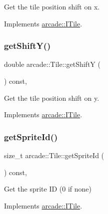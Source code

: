 Get the tile position shift on x. 



Implements \hyperlink{classarcade_1_1_i_tile_aaa83bd96759c2c9f369be4b00b8a72d2}{arcade\+::\+I\+Tile}.

\mbox{\label{classarcade_1_1_tile_aa28fe418563d90bd65e1c58510d28eef}} 
\subsubsection{\texorpdfstring{get\+Shift\+Y()}{getShiftY()}}
{\footnotesize\ttfamily double arcade\+::\+Tile\+::get\+ShiftY (\begin{DoxyParamCaption}{ }\end{DoxyParamCaption}) const\hspace{0.3cm}{\ttfamily [override]}, {\ttfamily [virtual]}}



Get the tile position shift on y. 



Implements \hyperlink{classarcade_1_1_i_tile_af7ca3cfb598eda00ac5b5f15f096e32f}{arcade\+::\+I\+Tile}.

\mbox{\label{classarcade_1_1_tile_afe2b3e7b4a6880b03772c240a2122d16}} 
\subsubsection{\texorpdfstring{get\+Sprite\+Id()}{getSpriteId()}}
{\footnotesize\ttfamily size\+\_\+t arcade\+::\+Tile\+::get\+Sprite\+Id (\begin{DoxyParamCaption}{ }\end{DoxyParamCaption}) const\hspace{0.3cm}{\ttfamily [override]}, {\ttfamily [virtual]}}



Get the sprite ID (0 if none) 



Implements \hyperlink{classarcade_1_1_i_tile_a4c09e2ac12d75fe12e3d4d1ca4e08150}{arcade\+::\+I\+Tile}.

\mbox{\label{classarcade_1_1_tile_a0dfe91e5896b8cfc3afac522d901be0a}} 
